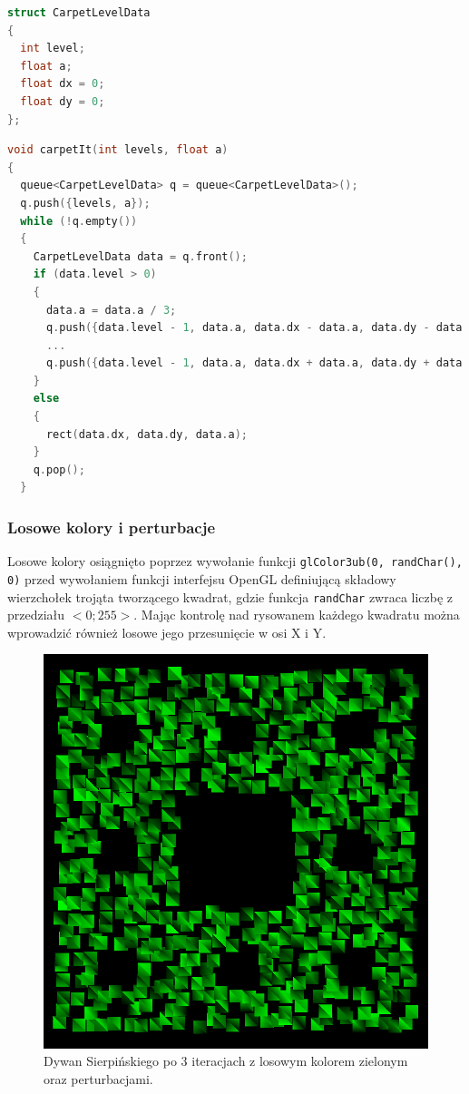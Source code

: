 \begin{lstlisting}[language=C++, caption=Struktura danych przechowująca aktualny stan rysowania.]
struct CarpetLevelData
{
  int level;
  float a;
  float dx = 0;
  float dy = 0;
};
\end{lstlisting}


\begin{lstlisting}[language=C++, caption=Funkcja rysująca dywan Sierpińskiego iteracyjnie. Pominięto niektóre wywołania.]
void carpetIt(int levels, float a)
{
  queue<CarpetLevelData> q = queue<CarpetLevelData>();
  q.push({levels, a});
  while (!q.empty())
  {
    CarpetLevelData data = q.front();
    if (data.level > 0)
    {
      data.a = data.a / 3;
      q.push({data.level - 1, data.a, data.dx - data.a, data.dy - data.a});
      ...
      q.push({data.level - 1, data.a, data.dx + data.a, data.dy + data.a});
    }
    else
    {
      rect(data.dx, data.dy, data.a);
    }
    q.pop();
  }
\end{lstlisting}

\subsubsection{Losowe kolory i perturbacje}
Losowe kolory osiągnięto poprzez wywołanie funkcji \lstinline{glColor3ub(0, randChar(), 0)} przed wywołaniem funkcji interfejsu OpenGL definiującą składowy wierzchołek trojąta tworzącego kwadrat, gdzie funkcja \lstinline{randChar} zwraca liczbę z przedziału $<0;255>$. Mając kontrolę nad rysowanem każdego kwadratu można wprowadzić również losowe jego przesunięcie w osi X i Y.

\begin{figure}[h]
  \centering
  \includegraphics[width=0.4\linewidth]{img/serpinski_3_s3.png}
  \caption{Dywan Sierpińskiego po 3 iteracjach z losowym kolorem zielonym oraz perturbacjami.}
\end{figure}